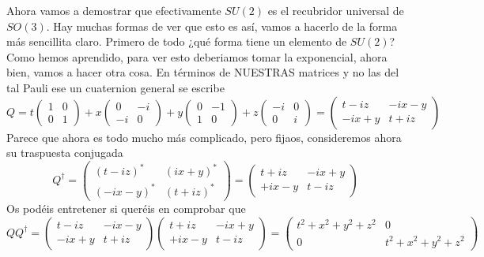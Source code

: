\documentclass[12pt]{article}
\begin{document}
Ahora vamos a demostrar que efectivamente $SU(2)$ es el recubridor universal de $SO(3)$. Hay muchas formas de ver que esto es así, vamos a hacerlo de la forma más sencillita claro. Primero de todo ¿qué forma tiene un elemento de $SU(2)$? Como hemos aprendido, para ver esto deberiamos tomar la exponencial, ahora bien, vamos a hacer otra cosa. En términos de NUESTRAS matrices y no las del tal Pauli ese un cuaternion general se escribe
\begin{equation}
    Q=t\begin{pmatrix}
        1 & 0 \\ 0 & 1
    \end{pmatrix} + x\begin{pmatrix}
        0 & -i \\ -i & 0
    \end{pmatrix}+y\begin{pmatrix}
        0 & -1 \\ 1 & 0 
    \end{pmatrix}+z \begin{pmatrix}
        -i & 0 \\ 0 & i
    \end{pmatrix} = \begin{pmatrix}
        t-iz & -ix-y \\ -ix+y & t+iz
    \end{pmatrix}
\end{equation}
Parece que ahora es todo mucho más complicado, pero fijaos, consideremos ahora su traspuesta conjugada 
\begin{equation}
    Q^\dagger= \begin{pmatrix}
        (t-iz)^* & (ix+y)^* \\  (-ix-y)^* & (t+iz)^* 
    \end{pmatrix} =\begin{pmatrix}
        t+iz & -ix +y \\ +ix-y & t-iz
    \end{pmatrix}
\end{equation}
Os podéis entretener si queréis en comprobar que 
\begin{equation*}
    QQ^\dagger =\begin{pmatrix}
        t-iz & -ix-y \\ -ix+y & t+iz
    \end{pmatrix}\begin{pmatrix}
        t+iz & -ix +y \\ +ix-y & t-iz
    \end{pmatrix} =\begin{pmatrix}
        t^2+x^2+y^2+z^2 &0 \\ 0 & t^2+x^2+y^2+z^2
    \end{pmatrix}
\end{equation*}
\end{document}
